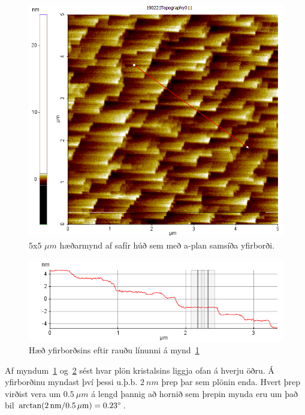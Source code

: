 \documentclass[11pt]{article}
\begin{document}
\begin{figure}[H]
  \centering
    \includegraphics[width=145mm]{Safir-A/Screenshot6.png}
    \caption{$5$x$5$ $\mu m$ hæðarmynd af safír húð sem með a-plan samsíða yfirborði.}
    \label{fig:A-plan fjarmynd}
\end{figure}

\begin{figure}[H]
  \centering
    \includegraphics[width=145mm]{Safir-A/190221Topography011_Line_slanted}
    \caption{Hæð yfirborðsins eftir rauðu línunni á mynd~\ref{fig:A-plan fjarmynd}}
    \label{fig:A-plan línurit fjarmynd}
\end{figure}

Af myndum~\ref{fig:A-plan fjarmynd} og~\ref{fig:A-plan línurit fjarmynd} sést hvar plön kristalsins liggja ofan á hverju öðru. Á yfirborðinu myndast því þessi u.þ.b. $\SI{2}{nm}$ þrep þar sem plönin enda. Hvert þrep virðist vera um $\SI{0.5}{\mu m}$ á lengd þannig að hornið sem þrepin mynda eru um það bil $\arctan(\SI{2}{nm}/\SI{0.5}{\mu m}) = 0.23\degree$.
\end{document}
